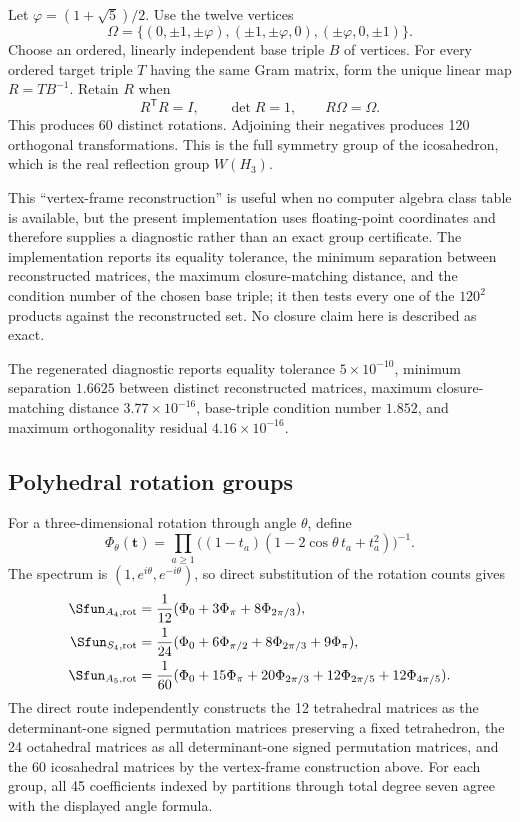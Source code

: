 \documentclass[10pt]{article}
\begin{document}
Let $\varphi=(1+\sqrt5)/2$.  Use the twelve vertices
\begin{equation}
\Omega=\{(0,\pm1,\pm\varphi),(\pm1,\pm\varphi,0),
(\pm\varphi,0,\pm1)\}.                                      \tag{3}
\end{equation}
Choose an ordered, linearly independent base triple $B$ of vertices.  For
every ordered target triple $T$ having the same Gram matrix, form the unique
linear map $R=TB^{-1}$.  Retain $R$ when
\[
R^{\mathsf T}R=I,\qquad\det R=1,\qquad R\Omega=\Omega.
\]
This produces 60 distinct rotations.  Adjoining their negatives produces 120
orthogonal transformations.  This is the full symmetry group of the
icosahedron, which is the real reflection group $W(H_3)$.

This ``vertex-frame reconstruction'' is useful when no computer algebra class
table is available, but the present implementation uses floating-point
coordinates and therefore supplies a diagnostic rather than an exact group
certificate.  The implementation reports its equality tolerance, the minimum
separation between reconstructed matrices, the maximum closure-matching
distance, and the condition number of the chosen base triple; it then tests
every one of the $120^2$ products against the reconstructed set.  No closure
claim here is described as exact.

The regenerated diagnostic reports equality tolerance $5\times10^{-10}$,
minimum separation $1.6625$ between distinct reconstructed matrices, maximum
closure-matching distance $3.77\times10^{-16}$, base-triple condition number
$1.852$, and maximum orthogonality residual $4.16\times10^{-16}$.

\subsection{Polyhedral rotation groups}

For a three-dimensional rotation through angle $\theta$, define
\[
\Phi_\theta(\mathbf t)=\prod_{a\geq1}
\big((1-t_a)(1-2\cos\theta\,t_a+t_a^2)\big)^{-1}.
\]
The spectrum is $(1,e^{i\theta},e^{-i\theta})$, so direct substitution of the
rotation counts gives
\begin{align*}
\Sfun_{A_4,\mathrm{rot}}&=\frac1{12}
(\Phi_0+3\Phi_\pi+8\Phi_{2\pi/3}),\\
\Sfun_{S_4,\mathrm{rot}}&=\frac1{24}
(\Phi_0+6\Phi_{\pi/2}+8\Phi_{2\pi/3}+9\Phi_\pi),\\
\Sfun_{A_5,\mathrm{rot}}&=\frac1{60}
(\Phi_0+15\Phi_\pi+20\Phi_{2\pi/3}
+12\Phi_{2\pi/5}+12\Phi_{4\pi/5}).
\end{align*}
The direct route independently constructs the 12 tetrahedral matrices as the
determinant-one signed permutation matrices preserving a fixed tetrahedron,
the 24 octahedral matrices as all determinant-one signed permutation matrices,
and the 60 icosahedral matrices by the vertex-frame construction above.  For
each group, all 45 coefficients indexed by partitions through total degree
seven agree with the displayed angle formula.
\end{document}
